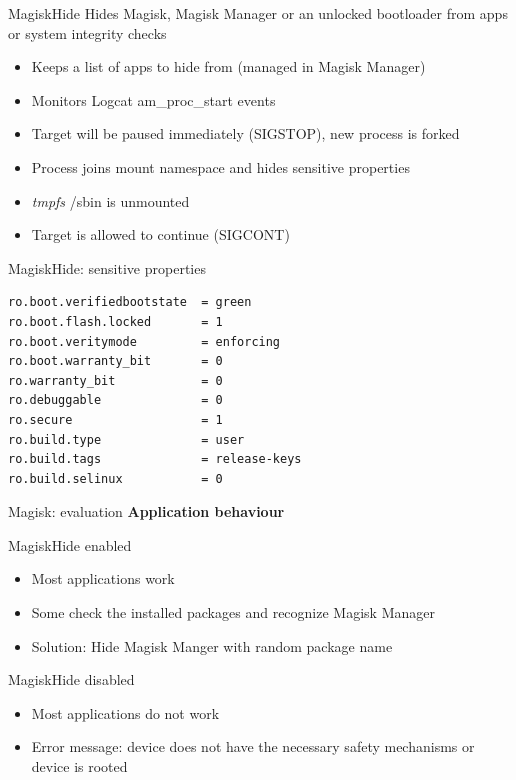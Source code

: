 \documentclass[
    11pt,%
    aspectratio=169,%
]{beamer}
\begin{document}
\begin{frame}{MagiskHide}
Hides Magisk, Magisk Manager or an unlocked bootloader from apps or system integrity checks
\begin{itemize}
\item Keeps a list of apps to hide from (managed in Magisk Manager)\newline
\item Monitors Logcat \alert{am\_proc\_start} events\newline
\item Target will be paused immediately (SIGSTOP), new process is forked\newline
\item Process joins mount namespace and hides sensitive properties\newline
\item \emph{tmpfs} /sbin is unmounted\newline
\item Target is allowed to continue (SIGCONT)
\end{itemize}
\end{frame}





\begin{frame}[fragile]{MagiskHide: sensitive properties}
\begin{verbatim}
ro.boot.verifiedbootstate  = green
ro.boot.flash.locked       = 1
ro.boot.veritymode         = enforcing
ro.boot.warranty_bit       = 0
ro.warranty_bit            = 0
ro.debuggable              = 0
ro.secure                  = 1
ro.build.type              = user
ro.build.tags              = release-keys
ro.build.selinux           = 0
\end{verbatim}
\end{frame}




\begin{frame}{Magisk: evaluation}
\textbf{Application behaviour}
\begin{exampleblock}{MagiskHide enabled}
\begin{itemize}
  \item Most applications work
  \item Some check the installed packages and recognize Magisk Manager
  \item \alert{Solution}: Hide Magisk Manger with random package name
\end{itemize}
\end{exampleblock}
\begin{exampleblock}{MagiskHide disabled}
\begin{itemize}
  \item Most applications do not work
  \item \alert{Error message}: device does not have the necessary safety mechanisms or device is rooted
\end{itemize}
\end{exampleblock}
\end{frame}
\end{document}
